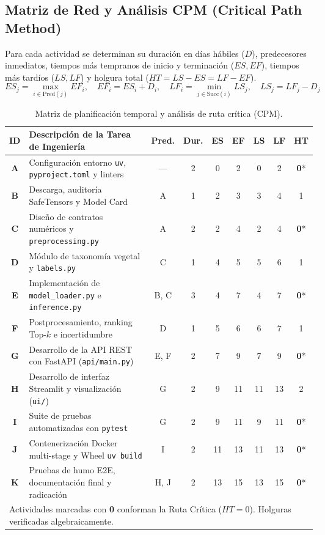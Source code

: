 \documentclass[12pt,letterpaper]{article}
\begin{document}
\subsection{Matriz de Red y Análisis CPM (Critical Path Method)}
Para cada actividad se determinan su duración en días hábiles ($D$), predecesores inmediatos, tiempos más tempranos de inicio y terminación ($ES, EF$), tiempos más tardíos ($LS, LF$) y holgura total ($HT = LS - ES = LF - EF$).
\begin{equation}
ES_j = \operatorname{max}_{i \in \text{Pred}(j)} EF_i, \quad EF_i = ES_i + D_i, \quad LF_i = \operatorname{min}_{j \in \text{Succ}(i)} LS_j, \quad LS_j = LF_j - D_j
\end{equation}

\begin{table}[!htbp]
\centering
\caption{Matriz de planificación temporal y análisis de ruta crítica (CPM).}
\label{tab:cpm}
\footnotesize
\setlength{\tabcolsep}{3.8pt}
\begin{tabularx}{\textwidth}{c X c c c c c c c}
\toprule
\textbf{ID} & \textbf{Descripción de la Tarea de Ingeniería} & \textbf{Pred.} & \textbf{Dur.} & \textbf{ES} & \textbf{EF} & \textbf{LS} & \textbf{LF} & \textbf{HT} \\
\midrule
\textbf{A} & Configuración entorno \texttt{uv}, \texttt{pyproject.toml} y linters & --- & 2 & 0 & 2 & 0 & 2 & \textbf{0}* \\
\textbf{B} & Descarga, auditoría SafeTensors y Model Card & A & 1 & 2 & 3 & 3 & 4 & 1 \\
\textbf{C} & Diseño de contratos numéricos y \texttt{preprocessing.py} & A & 2 & 2 & 4 & 2 & 4 & \textbf{0}* \\
\textbf{D} & Módulo de taxonomía vegetal y \texttt{labels.py} & C & 1 & 4 & 5 & 5 & 6 & 1 \\
\textbf{E} & Implementación de \texttt{model\_loader.py} e \texttt{inference.py} & B, C & 3 & 4 & 7 & 4 & 7 & \textbf{0}* \\
\textbf{F} & Postprocesamiento, ranking Top-$k$ e incertidumbre & D & 1 & 5 & 6 & 6 & 7 & 1 \\
\textbf{G} & Desarrollo de la API REST con FastAPI (\texttt{api/main.py}) & E, F & 2 & 7 & 9 & 7 & 9 & \textbf{0}* \\
\textbf{H} & Desarrollo de interfaz Streamlit y visualización (\texttt{ui/}) & G & 2 & 9 & 11 & 11 & 13 & 2 \\
\textbf{I} & Suite de pruebas automatizadas con \texttt{pytest} & G & 2 & 9 & 11 & 9 & 11 & \textbf{0}* \\
\textbf{J} & Contenerización Docker multi-stage y Wheel \texttt{uv build} & I & 2 & 11 & 13 & 11 & 13 & \textbf{0}* \\
\textbf{K} & Pruebas de humo E2E, documentación final y radicación & H, J & 2 & 13 & 15 & 13 & 15 & \textbf{0}* \\
\bottomrule
\multicolumn{9}{l}{\footnotesize *Actividades marcadas con \textbf{0} conforman la Ruta Crítica ($HT = 0$). Holguras verificadas algebraicamente.}
\end{tabularx}
\end{table}
\end{document}
